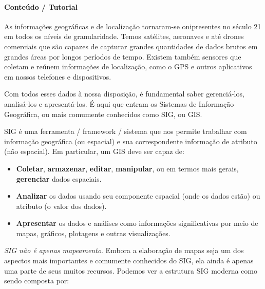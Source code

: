 \documentclass[
]{book}
\providecommand{\tightlist}{%
  \setlength{\itemsep}{0pt}\setlength{\parskip}{0pt}}
\theoremstyle{definition}
\theoremstyle{definition}
\theoremstyle{definition}
\theoremstyle{definition}
\theoremstyle{remark}
\begin{document}
\hypertarget{conteuxfado-tutorial-2}{%
\paragraph{Conteúdo / Tutorial}\label{conteuxfado-tutorial-2}}

As informações geográficas e de localização tornaram-se onipresentes no século 21 em todos os níveis de granularidade. Temos satélites, aeronaves e até drones comerciais que são capazes de capturar grandes quantidades de dados brutos em grandes áreas por longos períodos de tempo. Existem também sensores que coletam e reúnem informações de localização, como o GPS e outros aplicativos em nossos telefones e dispositivos.

Com todos esses dados à nossa disposição, é fundamental saber gerenciá-los, analisá-los e apresentá-los. É aqui que entram os Sistemas de Informação Geográfica, ou mais comumente conhecidos como SIG, ou GIS.

SIG é uma ferramenta / framework / sistema que nos permite trabalhar com informação geográfica (ou espacial) e sua correspondente informação de atributo (não espacial). Em particular, um GIS deve ser capaz de:

\begin{itemize}
\tightlist
\item
  \textbf{Coletar}, \textbf{armazenar}, \textbf{editar}, \textbf{manipular}, ou em termos mais gerais, \textbf{gerenciar} dados espaciais.
\item
  \textbf{Analizar} os dados usando seu componente espacial (onde os dados estão) ou atributo (o valor dos dados).
\item
  \textbf{Apresentar} os dados e análises como informações significativas por meio de mapas, gráficos, plotagens e outras visualizações.
\end{itemize}

\emph{SIG não é apenas mapeamento}. Embora a elaboração de mapas seja um dos aspectos mais importantes e comumente conhecidos do SIG, ela ainda é apenas uma parte de seus muitos recursos. Podemos ver a estrutura SIG moderna como sendo composta por:
\end{document}
